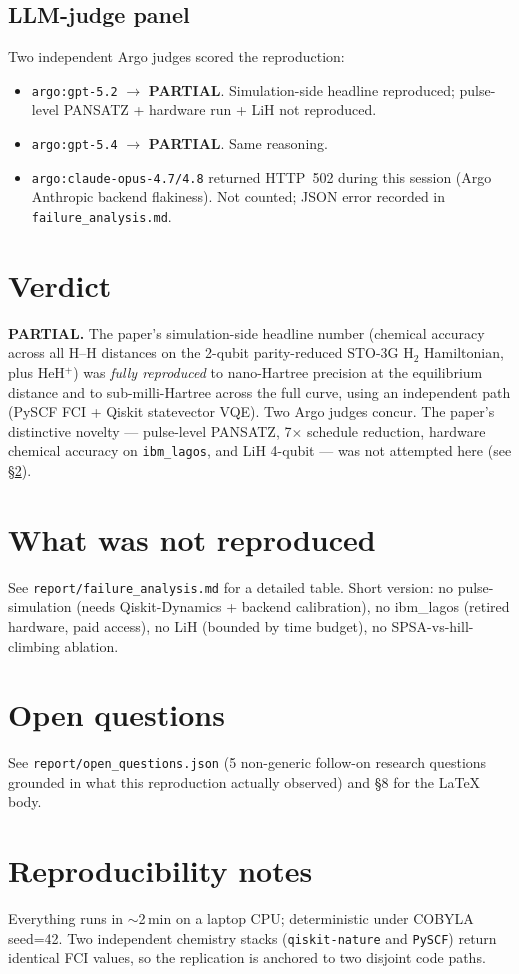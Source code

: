 \documentclass[11pt,letterpaper]{article}
\begin{document}
\subsection{LLM-judge panel}

Two independent Argo judges scored the reproduction:
\begin{itemize}
\item \texttt{argo:gpt-5.2} $\rightarrow$ \textbf{PARTIAL}. Simulation-side headline reproduced; pulse-level PANSATZ + hardware run + LiH not reproduced.
\item \texttt{argo:gpt-5.4} $\rightarrow$ \textbf{PARTIAL}. Same reasoning.
\item \texttt{argo:claude-opus-4.7/4.8} returned HTTP~502 during this session (Argo Anthropic backend flakiness). Not counted; JSON error recorded in \texttt{failure\_analysis.md}.
\end{itemize}

\section{Verdict}

\noindent\textbf{PARTIAL.} The paper's simulation-side headline number (chemical accuracy across all H--H distances on the 2-qubit parity-reduced STO-3G H$_2$ Hamiltonian, plus HeH$^+$) was \emph{fully reproduced} to nano-Hartree precision at the equilibrium distance and to sub-milli-Hartree across the full curve, using an independent path (PySCF FCI + Qiskit statevector VQE). Two Argo judges concur. The paper's distinctive novelty --- pulse-level PANSATZ, 7$\times$ schedule reduction, hardware chemical accuracy on \texttt{ibm\_lagos}, and LiH 4-qubit --- was not attempted here (see \S\ref{sec:gaps}).

\section{What was not reproduced}
\label{sec:gaps}
See \texttt{report/failure\_analysis.md} for a detailed table. Short version: no pulse-simulation (needs Qiskit-Dynamics + backend calibration), no ibm\_lagos (retired hardware, paid access), no LiH (bounded by time budget), no SPSA-vs-hill-climbing ablation.

\section{Open questions}
See \texttt{report/open\_questions.json} (5 non-generic follow-on research questions grounded in what this reproduction actually observed) and \S8 for the LaTeX body.



\section{Reproducibility notes}

Everything runs in $\sim$2\,min on a laptop CPU; deterministic under COBYLA seed=42. Two independent chemistry stacks (\texttt{qiskit-nature} and \texttt{PySCF}) return identical FCI values, so the replication is anchored to two disjoint code paths.
\end{document}
